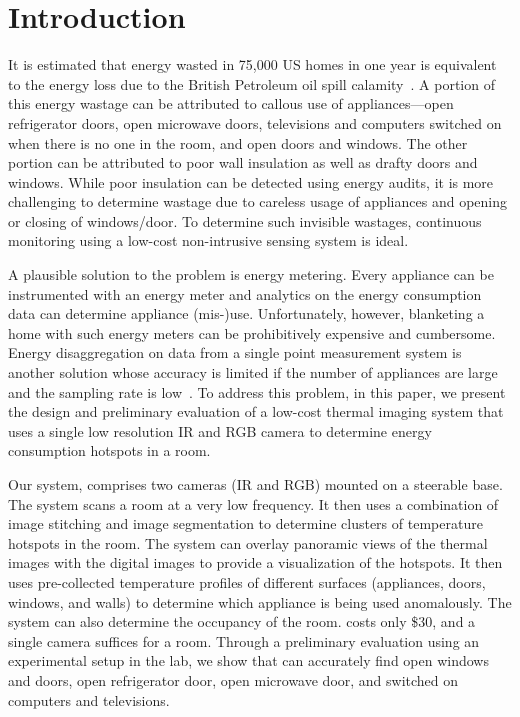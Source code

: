 \section{Introduction}
\label{sec:intro}

It is estimated that energy wasted in 75,000 US homes in one year is equivalent to the energy loss due to the British Petroleum oil
spill calamity~\cite{EIA2014}. A portion of this energy wastage can be attributed to callous use of appliances---open refrigerator doors,
open microwave doors, televisions and computers switched on when there is no one in the room, and open doors and windows. The other
portion can be attributed to poor wall insulation as well as drafty doors and windows. While poor insulation can be detected using
energy audits, it is more challenging to determine wastage due to careless usage of appliances and opening or closing of windows/door.
To determine such invisible wastages, continuous monitoring using a low-cost non-intrusive sensing system is ideal.

A plausible solution to the problem is energy metering. Every appliance can be instrumented with an energy meter and analytics on the
energy consumption data can determine appliance (mis-)use. Unfortunately, however, blanketing a home with such energy meters can be
prohibitively expensive and cumbersome. Energy disaggregation on data from a single point measurement system is another solution 
whose accuracy is limited if the number of appliances are large and the sampling rate is low~\cite{XX}. To address this problem, in
this paper, we present the design and preliminary evaluation of a low-cost thermal imaging system that uses a single low resolution IR
and RGB camera to determine energy consumption hotspots in a room.

Our system, {\IRLeak} comprises two cameras (IR and RGB) mounted on a steerable base. The system scans a room at a very low frequency.
It then uses a combination of image stitching and image segmentation to determine clusters of temperature hotspots in the room. The
system can overlay panoramic views of the thermal images with the digital images to provide a visualization of the hotspots. It then
uses pre-collected temperature profiles of different surfaces (appliances, doors, windows, and walls) to determine which appliance is
being used anomalously. The system can also determine the occupancy of the room. {\IRLeak} costs only \$30, and a single camera
suffices for a room. Through a preliminary evaluation using an experimental setup in the lab, we show that {\IRLeak} can accurately
find open windows and doors, open refrigerator door, open microwave door, and switched on computers and televisions. 

